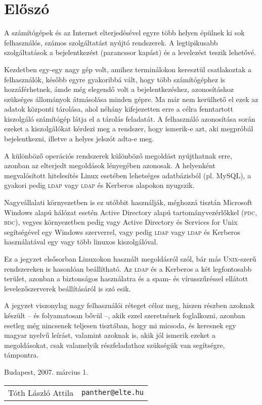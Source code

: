 \chapter*{Előszó}
A számítógépek és az Internet elterjedésével egyre több helyen épülnek ki sok felhasználós, számos szolgáltatást nyújtó
rendszerek. A legtipikusabb szolgáltatások a bejelentkezést (parancssor kapást) és a levelezést teszik lehetővé.

Kezdetben egy-egy nagy gép volt, amihez terminálokon keresztül csatlakoztak a felhasználók, később egyre gyakoribbá
vált, hogy több számítógéphez is hozzáférhetnek, ámde még elegendő volt a bejelentkezéshez, azonosításhoz szükséges
állományok átmásolása minden gépre. Ma már nem kerülhető el ezek az adatok központi tárolása, ahol néhány kifejezetten
erre a célra fenntartott kiszolgáló számítógép látja el a tárolás feladatát. A felhasználó azonosítása során ezeket a
kiszolgálókat kérdezi meg a rendszer, hogy ismerik-e azt, aki megpróbál bejelentkezni, illetve a helyes jelszót adta-e
meg.

A különböző operációs rendszerek különböző megoldást nyújthatnak erre, azonban az elterjedt megoldások lényegében
azonosak. A helyenként megvalósított hitelesítés Linux esetében lehetséges adatbázisból (pl. MySQL), a gyakori pedig
\textsc{ldap} vagy \textsc{ldap} és Kerberos alapokon nyugszik.

Nagyvállalati környezetben is ez utóbbit használják, méghozzá tisztán Microsoft Windows alapú hálózat esetén Active
Directory alapú tartományvezérlőkkel (\textsc{pdc}, \textsc{bdc}), vegyes környezetben pedig vagy Active Directory és
Services for Unix segítségével egy Windows szerverrel, vagy pedig \textsc{ldap} vagy \textsc{ldap} és Kerberos
használatával egy vagy több linuxos kiszolgálóval.

Ez a jegyzet elsősorban Linuxokon használt  megoldásról szól, bár más \textsc{Unix}-szerű rendszereken is hasonlóan
beállítható. Az \textsc{ldap} és a Kerberos a két legfontosabb terület, azonban a biztonságos használatra és a spam- és
vírusszűréssel ellátott levelezőszerverek beállításáról is szó esik.

A jegyzet viszonylag nagy felhasználói réteget céloz meg, hiszen részben azoknak készült -- és folyamatosan bővül --,
akik ezzel szeretnének foglalkozni, azonban esetleg még nincsenek teljesen tisztában, hogy mi micsoda, és keresnek egy
magyar nyelvű leírást, valamint azoknak is, akik jól ismerik ezeket a megoldásokat, csak valamelyik részfeladathoz
szükségük van segítségre, támpontra.

\vspace{1em}\noindent Budapest, 2007. március 1.

\begin{flushright}
  \begin{tabular}{@{}ll}
    Tóth László Attila & \texttt{panther@elte.hu}
\end{tabular}
\end{flushright}




